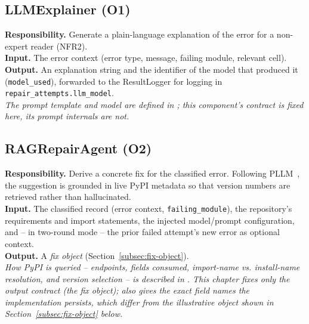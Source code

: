 \subsection{LLMExplainer (O1)}
\label{subsec:llmexplainer}
\textbf{Responsibility.} Generate a plain-language explanation of the
error for a non-expert reader (NFR2).\\
\textbf{Input.} The error context (error type, message, failing module,
relevant cell).\\
\textbf{Output.} An explanation string and the identifier of the model
that produced it (\texttt{model\_used}), forwarded to the ResultLogger
for logging in \texttt{repair\_attempts.llm\_model}.\\
\emph{The prompt template and model are defined in
; this component's contract is fixed here, its
prompt internals are not.}

\subsection{RAGRepairAgent (O2)}
\label{subsec:repairagent}
\textbf{Responsibility.} Derive a concrete fix for the classified error.
Following PLLM~\cite{bartlett2025pllm},
the suggestion is grounded in live PyPI metadata so that version numbers
are retrieved rather than hallucinated.\\
\textbf{Input.} The classified record (error context, \texttt{failing\_module}),
the repository's requirements and import statements, the injected
model/prompt configuration, and -- in two-round mode -- the prior failed
attempt's new error as optional context.\\
\textbf{Output.} A \emph{fix object} (Section~\ref{subsec:fix-object}).\\
\emph{How PyPI is queried -- endpoints, fields consumed, import-name vs.
install-name resolution, and version selection -- is described in
. This chapter fixes only the output contract (the fix
object);  also gives the exact field names the
implementation persists, which differ from the illustrative object shown in
Section~\ref{subsec:fix-object} below.}

